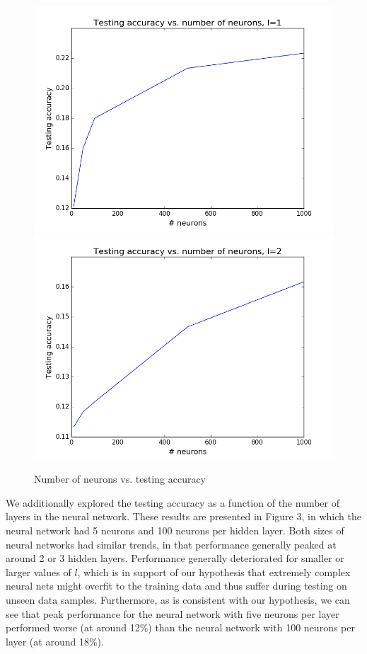 \documentclass{article}
\begin{document}
\begin{figure}[width=\linewidth]
\centering
\begin{multicols}{2}
  \includegraphics[width=1.2\linewidth]{code/P1/accuracy_vs_neurons,mnist.png}
  \includegraphics[width=1.2\linewidth]{code/P1/accuracy_vs_neurons,mnist,l2.png}
\end{multicols}
\caption{Number of neurons vs. testing accuracy}
\end{figure}

We additionally explored the testing accuracy as a function of the number of layers in the neural network. These results are presented in Figure 3, in which the neural network had 5 neurons and 100 neurons per hidden layer. Both sizes of neural networks had similar trends, in that performance generally peaked at around 2 or 3 hidden layers. Performance generally deteriorated for smaller or larger values of $l$, which is in support of our hypothesis that extremely complex neural nets might overfit to the training data and thus suffer during testing on unseen data samples. Furthermore, as is consistent with our hypothesis, we can see that peak performance for the neural network with five neurons per layer performed worse (at around 12\%) than the neural network with 100 neurons per layer (at around 18\%).
\end{document}
